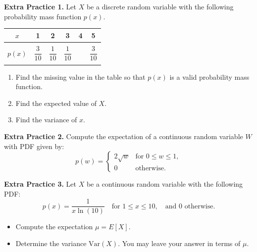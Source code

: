 \documentclass[10pt]{article}
\begin{document}

\newpage%

{\bf\color{blue}Extra Practice 1.}
Let $X$ be a discrete random variable with the following probability mass function $p(x)$.

\begin{table}[h!]
        \centering
        \begin{tabular}{c|ccccc}
            \hline
           $x$  & 1 & 2 & 3 & 4 & 5\\
           \hline\\
           $p(x)$  & $\dfrac{3}{10}$ & $\dfrac{1}{10}$ & $\dfrac{1}{10}$ & & $\dfrac{3}{10}$\\\\
           \hline
        \end{tabular}
    \end{table}

\begin{enumerate}
    \item[(a)] Find the missing value in the table so that $p(x)$ is a valid probability mass function.

    \item[(b)] Find the expected value of $X$.

    \vfill

    \item[(c)] Find the variance of $x$.
    
    \vfill
\end{enumerate}

\newpage%

{\bf\color{blue}Extra Practice 2.}
Compute the expectation of a continuous random variable $W$ with PDF given by:
\[
p(w) = 
\begin{cases} 
2\sqrt{w} & \text{for } 0 \leq w \leq 1, \\
0 & \text{otherwise}.
\end{cases}
\]

\vfill

{\bf\color{blue}Extra Practice 3.} 
Let $X$ be a continuous random variable with the following PDF:
\[
p(x) = \frac{1}{x \ln(10)} \quad \text{for } 1 \leq x \leq 10, \quad \text{and } 0 \text{ otherwise}.
\]
\begin{itemize}
    \item[(a)] Compute the expectation $\mu=E[X]$.
        \vfill
    \item[(b)] Determine the variance $\text{Var}(X)$. You may leave your answer in terms of $\mu$.
        \vfill
        \vfill
\end{itemize}
\end{document}
